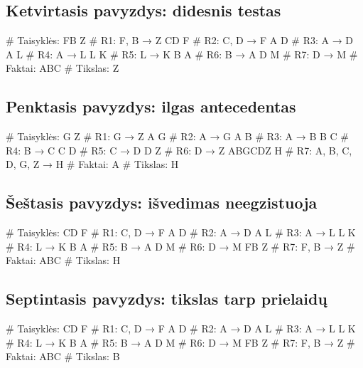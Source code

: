 \subsection{Ketvirtasis pavyzdys: didesnis testas}

\begin{pythonaienv}[fc]
# Taisyklės:
FB Z                                    # R1: F, B → Z
CD F                                    # R2: C, D → F
A D                                     # R3: A → D
A L                                     # R4: A → L
L K                                     # R5: L → K
B A                                     # R6: B → A
D M                                     # R7: D → M
# Faktai:
ABC
# Tikslas:
Z
\end{pythonaienv}

\subsection{Penktasis pavyzdys: ilgas antecedentas}

\begin{pythonaienv}[fc]
# Taisyklės:
G Z                                     # R1: G → Z
A G                                     # R2: A → G
A B                                     # R3: A → B
B C                                     # R4: B → C
C D                                     # R5: C → D
D Z                                     # R6: D → Z
ABGCDZ H                                # R7: A, B, C, D, G, Z → H
# Faktai:
A
# Tikslas:
H
\end{pythonaienv}

\subsection{Šeštasis pavyzdys: išvedimas neegzistuoja}

\begin{pythonaienv}[fc]
# Taisyklės:
CD F                                    # R1: C, D → F
A D                                     # R2: A → D
A L                                     # R3: A → L
L K                                     # R4: L → K
B A                                     # R5: B → A
D M                                     # R6: D → M
FB Z                                    # R7: F, B → Z
# Faktai:
ABC
# Tikslas:
H
\end{pythonaienv}

\subsection{Septintasis pavyzdys: tikslas tarp prielaidų}

\begin{pythonaienv}[fc]
# Taisyklės:
CD F                                    # R1: C, D → F
A D                                     # R2: A → D
A L                                     # R3: A → L
L K                                     # R4: L → K
B A                                     # R5: B → A
D M                                     # R6: D → M
FB Z                                    # R7: F, B → Z
# Faktai:
ABC
# Tikslas:
B
\end{pythonaienv}
